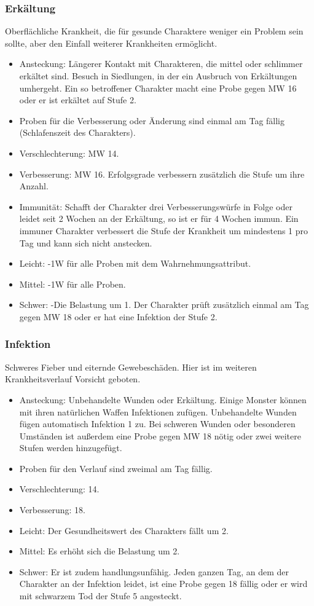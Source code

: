 \documentclass{article}
\begin{document}
\subsubsection{Erkältung}

Oberflächliche Krankheit, die für gesunde Charaktere weniger ein Problem sein sollte, aber den Einfall weiterer
Krankheiten ermöglicht.

\begin{itemize}
\item Ansteckung: Längerer Kontakt mit Charakteren, die mittel oder schlimmer erkältet sind. Besuch in Siedlungen, in der ein Ausbruch von Erkältungen umhergeht. Ein so betroffener Charakter macht eine Probe gegen MW 16 oder er ist erkältet auf Stufe 2.
\item Proben für die Verbesserung oder Änderung sind einmal am Tag fällig (Schlafenszeit des Charakters).
\item Verschlechterung: MW 14.
\item Verbesserung: MW 16. Erfolgsgrade verbessern zusätzlich die Stufe um ihre Anzahl.
\item Immunität: Schafft der Charakter drei Verbesserungswürfe in Folge oder leidet seit 2 Wochen an der Erkältung, so ist er für 4 Wochen immun. Ein immuner Charakter verbessert die Stufe der Krankheit um mindestens 1 pro Tag und kann sich nicht anstecken.
\item Leicht: -1W für alle Proben mit dem Wahrnehmungsattribut.
\item Mittel: -1W für alle Proben.
\item Schwer: -Die Belastung um 1. Der Charakter prüft zusätzlich einmal am Tag gegen MW 18 oder er hat eine Infektion der Stufe 2.
\end{itemize}

\subsubsection{Infektion}

Schweres Fieber und eiternde Gewebeschäden. Hier ist im weiteren Krankheitsverlauf Vorsicht geboten.

\begin{itemize}
\item Ansteckung: Unbehandelte Wunden oder Erkältung. Einige Monster können mit ihren natürlichen Waffen Infektionen zufügen. Unbehandelte Wunden fügen automatisch Infektion 1 zu. Bei schweren Wunden oder besonderen Umständen ist außerdem eine Probe gegen MW 18 nötig oder zwei weitere Stufen werden hinzugefügt.
\item Proben für den Verlauf sind zweimal am Tag fällig.
\item Verschlechterung: 14.
\item Verbesserung: 18.
\item Leicht: Der Gesundheitswert des Charakters fällt um 2.
\item Mittel: Es erhöht sich die Belastung um 2.
\item Schwer: Er ist zudem handlungsunfähig. Jeden ganzen Tag, an dem der Charakter an der Infektion leidet, ist eine Probe gegen 18 fällig oder er wird mit schwarzem Tod der Stufe 5 angesteckt.
\end{itemize}
\end{document}
